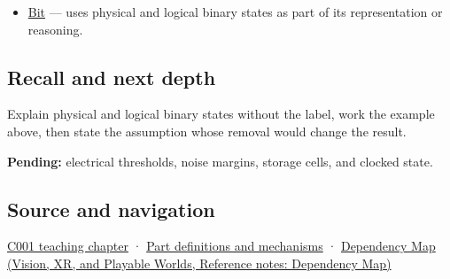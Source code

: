\begin{itemize}
\tightlist
\item
  \hyperref[appendix-ddbb69998a2e]{Bit} --- uses physical and logical binary states as part of its representation or reasoning.
\end{itemize}

\subsection{Recall and next depth}\label{appendix-ea798b1ceb35-recall-and-next-depth}

\hypertarget{appendix-ea798b1ceb35-recall-and-next-depth}{}

Explain physical and logical binary states without the label, work the example above, then state the assumption whose removal would change the result.

\textbf{Pending:} electrical thresholds, noise margins, storage cells, and clocked state.

\subsection{Source and navigation}\label{appendix-ea798b1ceb35-source-and-navigation}

\hypertarget{appendix-ea798b1ceb35-source-and-navigation}{}

\hyperref[01-foundations-i-ch001-from-a-signal-to-an-interpretation]{C001 teaching chapter} · \hyperref[appendix-fd090d982a15]{Part definitions and mechanisms} · \href{../07-Vision-XR-and-Playable-Worlds/main.pdf\#nameddest=appendix-4ad47bdd269a}{Dependency Map (Vision, XR, and Playable Worlds, Reference notes: Dependency Map)}
